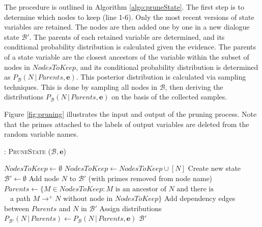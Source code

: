 The procedure is outlined in Algorithm \ref{algo:pruneState}. The first step is to determine which nodes to keep (line 1-6).  Only the most recent versions of state variables are retained. 
The nodes are then added one by one in a new dialogue state $\mathcal{B}'$.  The parents of each retained variable are determined, and its conditional probability distribution is calculated given the evidence.  The parents of a state variable are the closest ancestors of the variable within the subset of nodes in $\mathit{NodesToKeep}$, and its conditional probability distribution is determined as $P_{\mathcal{B}}(N \, | \, \mathit{Parents}, \mathbf{e})$.  This posterior distribution is calculated via sampling techniques. This is done by sampling all nodes in $\mathcal{B}$, then deriving the distributions $P_{\mathcal{B}}(N \, | \, \mathit{Parents}, \mathbf{e})$ on the basis of the collected samples.  

Figure \ref{fig:pruning} illustrates the input and output of the pruning process. Note that the primes attached to the labels of output variables are deleted from the random variable names.

\begin{algorithm}[h]
\caption{: \textsc{PruneState} ($\mathcal{B}, \mathbf{e}$)}
\begin{algorithmic}[1] \vspace{1mm}
\STATE $\mathit{NodesToKeep} \leftarrow \emptyset$
\STATE $\mathit{NodesToKeep} \leftarrow \mathit{NodesToKeep} \cup [N]$ 
\ENDIF
\ENDFOR
\STATE Create new state $\mathcal{B}' \leftarrow \emptyset$
\STATE Add node $N$ to $\mathcal{B}'$ (with primes removed from node name)
\STATE $\mathit{Parents} \leftarrow \{M \in \mathit{NodesToKeep} : M \text{ is an ancestor of } N \text{ and there is } $ \\ $\phantom{a}$  \; \; \; \; \; \; \; \; \;  a path $M \rightarrow^+  N \text{ without node in } \mathit{NodesToKeep} \}$ 
\STATE Add dependency edges between $\mathit{Parents}$ and $N$ in $\mathcal{B}'$
\STATE Assign distributions $P_{\mathcal{B}'}(N \, | \, \mathit{Parents}) \leftarrow P_{\mathcal{B}}(N \, | \, \mathit{Parents}, \mathbf{e})$
\ENDFOR
\RETURN $\mathcal{B}'$
\end{algorithmic}
\label{algo:pruneState}
\end{algorithm}


